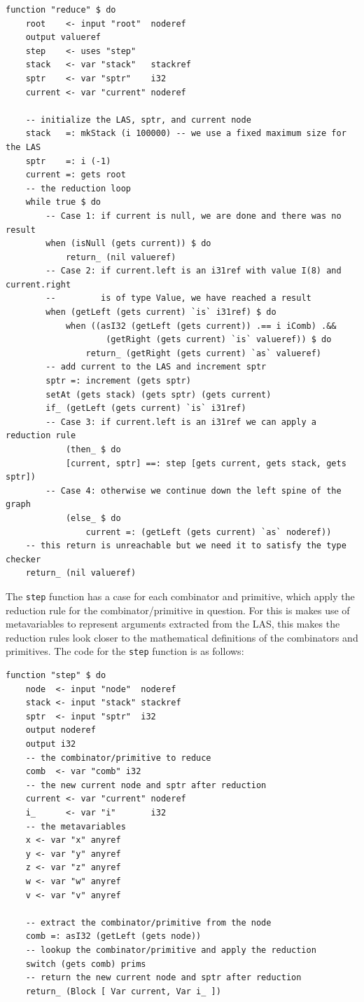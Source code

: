 \begin{verbatim}
function "reduce" $ do
    root    <- input "root"  noderef
    output valueref
    step    <- uses "step"
    stack   <- var "stack"   stackref
    sptr    <- var "sptr"    i32
    current <- var "current" noderef
    
    -- initialize the LAS, sptr, and current node
    stack   =: mkStack (i 100000) -- we use a fixed maximum size for the LAS
    sptr    =: i (-1)
    current =: gets root
    -- the reduction loop
    while true $ do
        -- Case 1: if current is null, we are done and there was no result
        when (isNull (gets current)) $ do
            return_ (nil valueref)
        -- Case 2: if current.left is an i31ref with value I(8) and current.right 
        --         is of type Value, we have reached a result
        when (getLeft (gets current) `is` i31ref) $ do
            when ((asI32 (getLeft (gets current)) .== i iComb) .&&
                    (getRight (gets current) `is` valueref)) $ do
                return_ (getRight (gets current) `as` valueref)
        -- add current to the LAS and increment sptr
        sptr =: increment (gets sptr)
        setAt (gets stack) (gets sptr) (gets current)
        if_ (getLeft (gets current) `is` i31ref)
        -- Case 3: if current.left is an i31ref we can apply a reduction rule
            (then_ $ do 
            [current, sptr] ==: step [gets current, gets stack, gets sptr])
        -- Case 4: otherwise we continue down the left spine of the graph
            (else_ $ do 
                current =: (getLeft (gets current) `as` noderef))
    -- this return is unreachable but we need it to satisfy the type checker
    return_ (nil valueref)
\end{verbatim}
The \texttt{step} function has a case for each combinator and primitive, which apply the reduction rule for the combinator/primitive in question. For this is makes use of metavariables to represent arguments extracted from the LAS, this makes the reduction rules look closer to the mathematical definitions of the combinators and primitives. The code for the \texttt{step} function is as follows:
\begin{verbatim}
function "step" $ do
    node  <- input "node"  noderef
    stack <- input "stack" stackref
    sptr  <- input "sptr"  i32
    output noderef
    output i32
    -- the combinator/primitive to reduce
    comb  <- var "comb" i32
    -- the new current node and sptr after reduction
    current <- var "current" noderef
    i_      <- var "i"       i32
    -- the metavariables
    x <- var "x" anyref
    y <- var "y" anyref
    z <- var "z" anyref
    w <- var "w" anyref
    v <- var "v" anyref

    -- extract the combinator/primitive from the node
    comb =: asI32 (getLeft (gets node))
    -- lookup the combinator/primitive and apply the reduction
    switch (gets comb) prims
    -- return the new current node and sptr after reduction
    return_ (Block [ Var current, Var i_ ])
\end{verbatim}
